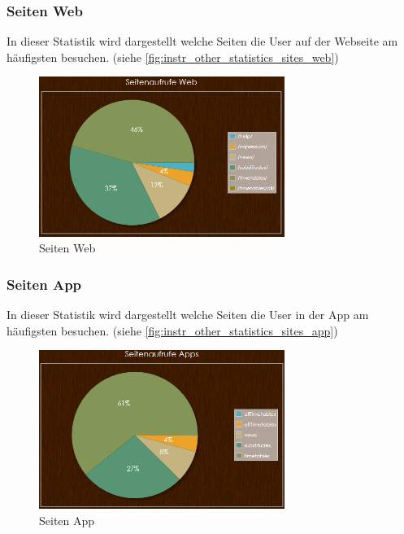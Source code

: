\subsubsection{Seiten Web}
In dieser Statistik wird dargestellt welche Seiten die User auf der Webseite am häufigsten besuchen. (siehe \autoref{fig:instr_other_statistics_sites_web})
\begin{figure}[H]
\centering
\includegraphics[keepaspectratio=true, width=8cm]{images/screenshots/statistics_sites_web.png}
\caption{Seiten Web}
\label{fig:instr_other_statistics_sites_web}
\end{figure}
\subsubsection{Seiten App}
In dieser Statistik wird dargestellt welche Seiten die User in der App am häufigsten besuchen. (siehe \autoref{fig:instr_other_statistics_sites_app})
\begin{figure}[H]
\centering
\includegraphics[keepaspectratio=true, width=8cm]{images/screenshots/statistics_sites_app.png}
\caption{Seiten App}
\label{fig:instr_other_statistics_sites_app}
\end{figure}
